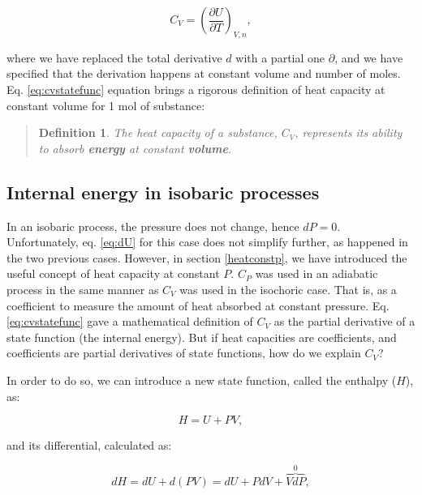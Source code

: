 \documentclass[
]{book}
\theoremstyle{definition}
\newtheorem{definition}{Definition}[chapter]
\theoremstyle{definition}
\theoremstyle{definition}
\theoremstyle{remark}
\begin{document}
\begin{equation}
  C_V = \left( \frac{\partial U} {\partial T} \right)_{V,n},
  \label{eq:cvstatefunc}
\end{equation}

where we have replaced the total derivative \(d\) with a partial one \(\partial\), and we have specified that the derivation happens at constant volume and number of moles. Eq. \eqref{eq:cvstatefunc} equation brings a rigorous definition of heat capacity at constant volume for 1 mol of substance:

\begin{quote}
\begin{definition}
\protect\hypertarget{def:newdefcv}{}{\label{def:newdefcv} }\emph{The heat capacity of a substance, \(C_V\), represents its ability to absorb \textbf{energy} at constant \textbf{volume}.}
\end{definition}
\end{quote}

\hypertarget{enthalpy}{%
\subsection{Internal energy in isobaric processes}\label{enthalpy}}

In an isobaric process, the pressure does not change, hence \(dP=0\). Unfortunately, eq. \eqref{eq:dU} for this case does not simplify further, as happened in the two previous cases. However, in section \ref{heatconstp}, we have introduced the useful concept of heat capacity at constant \(P\). \(C_P\) was used in an adiabatic process in the same manner as \(C_V\) was used in the isochoric case. That is, as a coefficient to measure the amount of heat absorbed at constant pressure. Eq. \eqref{eq:cvstatefunc} gave a mathematical definition of \(C_V\) as the partial derivative of a state function (the internal energy). But if heat capacities are coefficients, and coefficients are partial derivatives of state functions, how do we explain \(C_V\)?

In order to do so, we can introduce a new state function, called the enthalpy (\(H\)), as:

\begin{equation}
  H = U + PV,
  \label{eq:enthalpydef}
\end{equation}

and its differential, calculated as:

\begin{equation}
  dH = dU + d(PV) = dU + PdV + \overbrace{VdP}^{0},
  \label{eq:enthalpydefdiff}
\end{equation}
\end{document}
